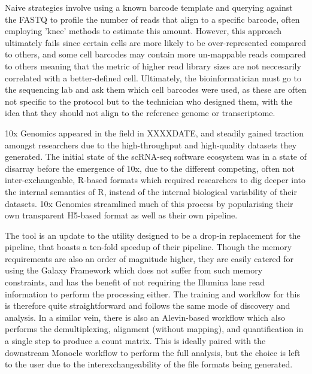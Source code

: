 \documentclass[a4paper,num-refs]{oup-contemporary}
\begin{document}
Naive strategies involve using a known barcode template and querying against the FASTQ to profile the number of reads that align to a specific barcode, often employing 'knee' methods to estimate this amount. However, this approach ultimately fails since certain cells are more likely to be over-represented compared to others, and some cell barcodes may contain more un-mappable reads compared to others meaning that the metric of higher read library sizes are not neccesarily correlated with a better-defined cell. Ultimately, the bioinformatician must go to the sequencing lab and ask them which cell barcodes were used, as these are often not specific to the protocol but to the technician who designed them, with the idea that they should not align to the reference genome or transcriptome.

10x Genomics appeared in the field in XXXXDATE, and steadily gained traction amongst researchers due to the high-throughput and high-quality datasets they generated. The initial state of the scRNA-seq software ecosystem was in a state of disarray before the emergence of 10x, due to the different competing, often not inter-exchangeable, R-based formats which required researchers to dig deeper into the internal semantics of R, instead of the internal biological variability of their datasets. 10x Genomics streamlined much of this process by popularising their own transparent H5-based format as well as their own  pipeline.

The  tool is an update to the  utility designed to be a drop-in replacement for the  pipeline, that boasts a ten-fold speedup of their pipeline. Though the memory requirements are also an order of magnitude higher, they are easily catered for using the Galaxy Framework which does not suffer from such memory constraints, and has the benefit of not requiring the Illumina lane read information to perform the processing either. The training and workflow for this is therefore quite straightforward and follows the same mode of discovery and analysis.
In a similar vein, there is also an Alevin-based workflow which also performs the demultiplexing, alignment (without mapping), and quantification in a single step to produce a count matrix. This is ideally paired with the downstream Monocle workflow to perform the full analysis, but the choice is left to the user due to the interexchangeability of the file formats being generated.
\end{document}
